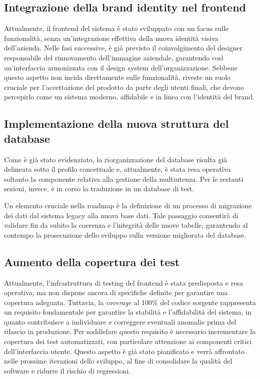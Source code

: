 \subsection{Integrazione della brand identity nel frontend}
Attualmente, il frontend del sistema è stato sviluppato con un focus sulle funzionalità, senza un’integrazione effettiva della nuova identità visiva dell'azienda. Nelle fasi successive, è già previsto il coinvolgimento del designer responsabile del rinnovamento dell'immagine aziendale, garantendo così un'interfaccia armonizzata con il design system dell'organizzazione. Sebbene questo aspetto non incida direttamente sulle funzionalità, riveste un ruolo cruciale per l’accettazione del prodotto da parte degli utenti finali, che devono percepirlo come un sistema moderno, affidabile e in linea con l’identità del brand.

\subsection{Implementazione della nuova struttura del database}
Come è già stato evidenziato, la riorganizzazione del database risulta già delineata sotto il profilo concettuale e, attualmente, è stata resa operativa soltanto la componente relativa alla gestione della multiutenza. Per le restanti sezioni, invece, è in corso la traduzione in un database di test.

Un elemento cruciale nella roadmap è la definizione di un processo di migrazione dei dati dal sistema legacy alla nuova base dati. Tale passaggio consentirà di validare fin da subito la coerenza e l’integrità delle nuove tabelle, garantendo al contempo la prosecuzione dello sviluppo sulla versione migliorata del database.

\subsection{Aumento della copertura dei test}
Attualmente, l’infrastruttura di testing del frontend è stata predisposta e resa operativa, ma non dispone ancora di specifiche definite per garantire una copertura adeguata. Tuttavia, la \textit{coverage} al 100\% del codice sorgente rappresenta un requisito fondamentale per garantire la stabilità e l’affidabilità del sistema, in quanto contribuisce a individuare e correggere eventuali anomalie prima del rilascio in produzione.
%
Per soddisfare questo requisito è necessario incrementare la copertura dei test automatizzati, con particolare attenzione ai componenti critici dell’interfaccia utente. Questo aspetto è già stato pianificato e verrà affrontato nelle prossime iterazioni dello sviluppo, al fine di consolidare la qualità del software e ridurre il rischio di regressioni.

